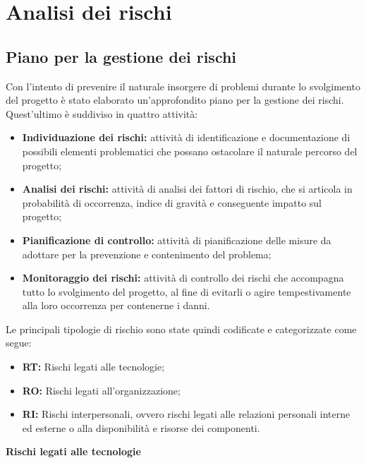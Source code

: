 \chapter{Analisi dei rischi}\label{AnalisiDeiRischi}

\section{Piano per la gestione dei rischi}\label{AnalisiDeiRischiPianoPerLaGestioneDeiRischi}
Con l'intento di prevenire il naturale insorgere di problemi durante lo svolgimento del progetto è stato elaborato un'approfondito piano per la gestione dei rischi. Quest'ultimo è suddiviso in quattro attività:
\begin{itemize}
  \item \textbf{Individuazione dei rischi:} attività di identificazione e documentazione di possibili elementi problematici che possano ostacolare il naturale percorso del progetto;
  \item \textbf{Analisi dei rischi:} attività di analisi dei fattori di rischio, che si articola in probabilità di occorrenza, indice di gravità e conseguente impatto sul progetto;
  \item \textbf{Pianificazione di controllo:} attività di pianificazione delle misure da adottare per la prevenzione e contenimento del problema;
  \item \textbf{Monitoraggio dei rischi:} attività di controllo dei rischi che accompagna tutto lo svolgimento del progetto, al fine di evitarli o agire tempestivamente alla loro occorrenza per contenerne i danni.
\end{itemize}
Le principali tipologie di rischio sono state quindi codificate e categorizzate come segue:
\begin{itemize}
  \item \textbf{RT:} Rischi legati alle tecnologie;
  \item \textbf{RO:} Rischi legati all'organizzazione;
  \item \textbf{RI:} Rischi interpersonali, ovvero rischi legati alle relazioni personali interne ed esterne o alla disponibilità e risorse dei componenti.
\end{itemize}

\quad
\begin{center}
	\LARGE\textbf{Rischi legati alle tecnologie}
\end{center}

